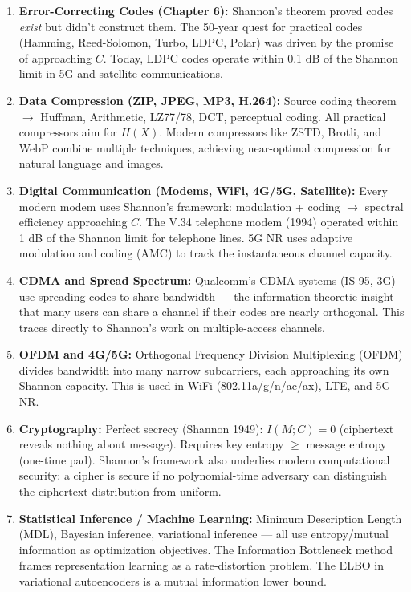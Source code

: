\begin{enumerate}
\item \textbf{Error-Correcting Codes (Chapter 6):} Shannon's theorem proved codes \emph{exist} but didn't construct them. The 50-year quest for practical codes (Hamming, Reed-Solomon, Turbo, LDPC, Polar) was driven by the promise of approaching $C$. Today, LDPC codes operate within 0.1 dB of the Shannon limit in 5G and satellite communications.

\item \textbf{Data Compression (ZIP, JPEG, MP3, H.264):} Source coding theorem $\to$ Huffman, Arithmetic, LZ77/78, DCT, perceptual coding. All practical compressors aim for $H(X)$. Modern compressors like ZSTD, Brotli, and WebP combine multiple techniques, achieving near-optimal compression for natural language and images.

\item \textbf{Digital Communication (Modems, WiFi, 4G/5G, Satellite):} Every modern modem uses Shannon's framework: modulation + coding $\to$ spectral efficiency approaching $C$. The V.34 telephone modem (1994) operated within 1 dB of the Shannon limit for telephone lines. 5G NR uses adaptive modulation and coding (AMC) to track the instantaneous channel capacity.

\item \textbf{CDMA and Spread Spectrum:} Qualcomm's CDMA systems (IS-95, 3G) use spreading codes to share bandwidth — the information-theoretic insight that many users can share a channel if their codes are nearly orthogonal. This traces directly to Shannon's work on multiple-access channels.

\item \textbf{OFDM and 4G/5G:} Orthogonal Frequency Division Multiplexing (OFDM) divides bandwidth into many narrow subcarriers, each approaching its own Shannon capacity. This is used in WiFi (802.11a/g/n/ac/ax), LTE, and 5G NR.

\item \textbf{Cryptography:} Perfect secrecy (Shannon 1949): $I(M;C) = 0$ (ciphertext reveals nothing about message). Requires key entropy $\ge$ message entropy (one-time pad). Shannon's framework also underlies modern computational security: a cipher is secure if no polynomial-time adversary can distinguish the ciphertext distribution from uniform.

\item \textbf{Statistical Inference / Machine Learning:} Minimum Description Length (MDL), Bayesian inference, variational inference — all use entropy/mutual information as optimization objectives. The Information Bottleneck method frames representation learning as a rate-distortion problem. The ELBO in variational autoencoders is a mutual information lower bound.


\end{enumerate}
